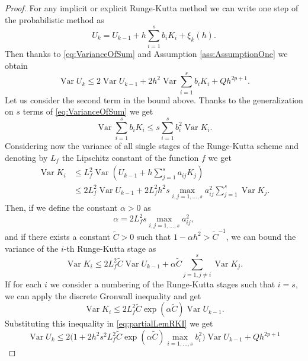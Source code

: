 \documentclass{siamart1116}
\numberwithin{theorem}{section}
\newcommand{\Var}{\operatorname{Var}}
\newcommand{\sksum}{\textstyle\sum}
\begin{document}
\begin{proof} For any implicit or explicit Runge-Kutta method we can write one step of the probabilistic method as
	\begin{equation}
		U_k = U_{k-1} + h\sksum_{i=1}^{s}b_iK_i + \xi_k(h).
	\end{equation}
	Then thanks to \eqref{eq:VarianceOfSum} and Assumption \ref{ass:AssumptionOne} we obtain
	\begin{equation}\label{eq:partialLemRKI}
		\Var U_k \leq 2 \Var U_{k-1}  + 2h^2\Var \sksum_{i=1}^{s}b_i K_i + Q h^{2p + 1}.
	\end{equation}
	Let us consider the second term in the bound above. Thanks to the generalization on $s$ terms of \eqref{eq:VarianceOfSum} we get
	\begin{equation}
	\Var \sksum_{i=1}^{s}b_i K_i \leq s \sksum_{i=1}^s b_i^2 \Var K_i.
	\end{equation}
	Considering now the variance of all single stages of the Runge-Kutta scheme and denoting by $L_f$ the Lipschitz constant of the function $f$ we get
	\begin{equation}
	\begin{aligned}
		\Var K_i  &\leq L_f^2 \Var(U_{k-1} + h\sksum_{j=1}^{s}a_{ij}K_j) \\
		&\leq 2L_f^2 \Var U_{k-1} + 2L_f^2h^2s\max_{i,j=1,\ldots,s}a_{ij}^2 \sksum_{j=1}^{s}\Var K_j.
	\end{aligned}
	\end{equation}
	Then, if we define the constant $\alpha > 0$ as
	\begin{equation}
		\alpha = 2L_f^2s\max_{i,j=1,\ldots,s}a_{ij}^2,
	\end{equation}
	and if there exists a constant $\tilde C > 0$ such that $1 - \alpha h^2 > \tilde C^{-1}$, we can bound the variance of the $i$-th Runge-Kutta stage as
	\begin{equation}
		\Var K_i \leq 2L_f^2 \tilde C \Var U_{k-1} + \alpha \tilde C \sksum_{j=1, j\neq i}^{s}\Var K_j. 
	\end{equation}
	If for each $i$ we consider a numbering of the Runge-Kutta stages such that $i = s$, we can apply the discrete Gronwall inequality and get
	\begin{equation}
		\Var K_i \leq 2L_f^2 \tilde C  \exp(\alpha \tilde C) \Var U_{k-1}.
	\end{equation}
	Substituting this inequality in \eqref{eq:partialLemRKI} we get
	\begin{equation}
		\Var U_k \leq 2\big(1 + 2 h^2 s^2 L_f^2 \tilde C  \exp(\alpha \tilde C)\max_{i=1,\ldots,s} b_i^2\big)\Var U_{k-1} + Q h^{2p+1}

\end{equation}
\end{proof}
\end{document}
